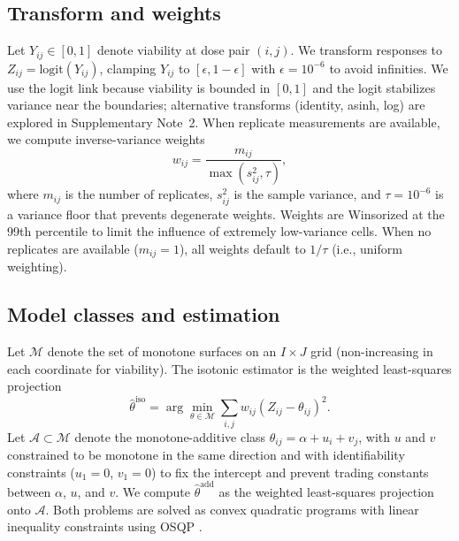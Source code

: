 \documentclass[unnumsec,webpdf,contemporary,large]{oup-authoring-template}
\begin{document}
\subsection{Transform and weights}
Let $Y_{ij}\in[0,1]$ denote viability at dose pair $(i,j)$.
We transform responses to $Z_{ij}=\mathrm{logit}(Y_{ij})$, clamping $Y_{ij}$ to $[\epsilon, 1-\epsilon]$ with $\epsilon=10^{-6}$ to avoid infinities.
We use the logit link because viability is bounded in $[0,1]$ and the logit stabilizes variance near the boundaries; alternative transforms (identity, asinh, log) are explored in Supplementary Note~2.
When replicate measurements are available, we compute inverse-variance weights
\begin{equation}
w_{ij}=\frac{m_{ij}}{\max(s^2_{ij},\tau)},
\end{equation}
where $m_{ij}$ is the number of replicates, $s^2_{ij}$ is the sample variance, and $\tau=10^{-6}$ is a variance floor that prevents degenerate weights.
Weights are Winsorized at the 99th percentile to limit the influence of extremely low-variance cells.
When no replicates are available ($m_{ij}=1$), all weights default to $1/\tau$ (i.e., uniform weighting).

\subsection{Model classes and estimation}
Let $\mathcal{M}$ denote the set of monotone surfaces on an $I\times J$ grid (non-increasing in each coordinate for viability).
The isotonic estimator is the weighted least-squares projection
\begin{equation}
\hat\theta^{\mathrm{iso}}=\arg\min_{\theta\in\mathcal{M}}\sum_{i,j} w_{ij}(Z_{ij}-\theta_{ij})^2.
\end{equation}
Let $\mathcal{A}\subset\mathcal{M}$ denote the monotone-additive class $\theta_{ij}=\alpha+u_i+v_j$, with $u$ and $v$ constrained to be monotone in the same direction and with identifiability constraints ($u_1=0$, $v_1=0$) to fix the intercept and prevent trading constants between $\alpha$, $u$, and $v$.
We compute $\hat\theta^{\mathrm{add}}$ as the weighted least-squares projection onto $\mathcal{A}$.
Both problems are solved as convex quadratic programs with linear inequality constraints using OSQP \cite{Stellato2020}.
\end{document}
